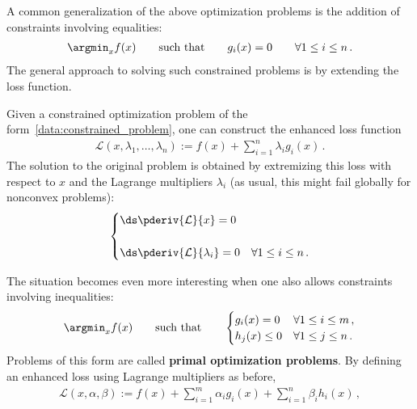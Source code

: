     A common generalization of the above optimization problems is the addition of constraints involving equalities:
    \begin{gather}
        \label{data:constrained_problem}
        \argmin_x f(x) \qquad\text{such that}\qquad g_i(x)=0\qquad\forall 1\leq i\leq n\,.
    \end{gather}
    The general approach to solving such constrained problems is by extending the loss function.
    \begin{method}
        Given a constrained optimization problem of the form~\eqref{data:constrained_problem}, one can construct the enhanced loss function
        \begin{gather}
            \mathcal{L}(x,\lambda_1,\ldots,\lambda_n) := f(x) + \sum_{i=1}^n\lambda_ig_i(x)\,.
        \end{gather}
        The solution to the original problem is obtained by extremizing this loss with respect to $x$ and the Lagrange multipliers $\lambda_i$ (as usual, this might fail globally for nonconvex problems):
        \begin{gather}
            \begin{cases}
                \ds\pderiv{\mathcal{L}}{x} = 0&\\
                \\
                \ds\pderiv{\mathcal{L}}{\lambda_i} = 0&\forall1\leq i\leq n\,.
            \end{cases}
        \end{gather}
    \end{method}
    The situation becomes even more interesting when one also allows constraints involving inequalities:
    \begin{gather}
        \label{data:constrained_optimization}
        \argmin_xf(x) \qquad\text{such that}\qquad
        \begin{cases}
            g_i(x)=0&\forall 1\leq i\leq m\,,\\
            h_j(x)\leq0&\forall 1\leq j\leq n\,.
        \end{cases}
    \end{gather}
    Problems of this form are called \textbf{primal optimization problems}. By defining an enhanced loss using Lagrange multipliers as before,
    \begin{gather}
        \mathcal{L}(x,\alpha,\beta) := f(x) + \sum_{i=1}^m\alpha_ig_i(x) + \sum_{i=1}^n\beta_ih_i(x)\,,
    \end{gather}
